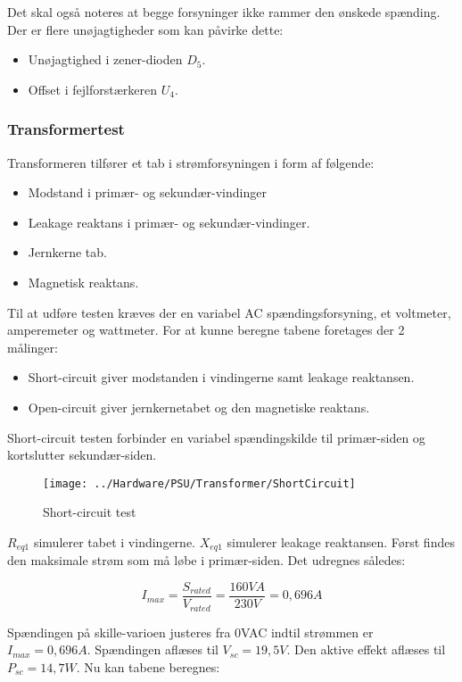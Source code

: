 Det skal også noteres at begge forsyninger ikke rammer den ønskede spænding. Der er flere unøjagtigheder som kan påvirke dette:
\begin{itemize}
\item Unøjagtighed i zener-dioden $D_5$.
\item Offset i fejlforstærkeren $U_4$.
\end{itemize}


\subsubsection{Transformertest}
Transformeren tilfører et tab i strømforsyningen i form af følgende:
\begin{itemize}
\item Modstand i primær- og sekundær-vindinger
\item Leakage reaktans i primær- og sekundær-vindinger.
\item Jernkerne tab.
\item Magnetisk reaktans.
\end{itemize}

Til at udføre testen kræves der en variabel AC spændingsforsyning, et voltmeter, amperemeter og wattmeter. For at kunne beregne tabene foretages der 2 målinger:
\begin{itemize}
\item Short-circuit giver modstanden i vindingerne samt leakage reaktansen.
\item Open-circuit giver jernkernetabet og den magnetiske reaktans.
\end{itemize}


Short-circuit testen forbinder en variabel spændingskilde til primær-siden og kortslutter sekundær-siden.

\begin{figure}[H]
	\centering
	\texttt{[image: ../Hardware/PSU/Transformer/ShortCircuit]}
	\caption{Short-circuit test}
	\label{photo:ShortCircuit}
\end{figure}

$R_{eq1}$ simulerer tabet i vindingerne. $X_{eq1}$ simulerer leakage reaktansen. Først findes den maksimale strøm som må løbe i primær-siden. Det udregnes således:

\begin{equation}
	I_{max} = \frac{S_{rated}}{V_{rated}} = \frac{160VA}{230V} = 0,696A
\end{equation} 

Spændingen på skille-varioen justeres fra 0VAC indtil strømmen er $I_{max} = 0,696A$. Spændingen aflæses til $V_{sc} = 19,5V$. Den aktive effekt aflæses til $P_{sc} = 14,7W$. Nu kan tabene beregnes:

